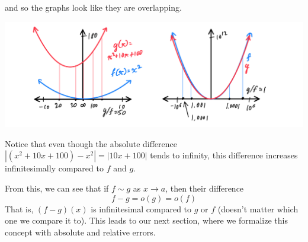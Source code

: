 \documentclass{article}
\theoremstyle{remark}
\theoremstyle{definition}
\begin{document}
\begin{enumerate}
    and so the graphs look like they are overlapping. 
    \begin{center}
        \includegraphics[scale=0.3]{img/Behavior_of_Quadratics_of_Same_order_as_infinity.PNG}
    \end{center}
    Notice that even though the absolute difference $|(x^2 + 10x + 100) - x^2| = |10x + 100|$ tends to infinity, this difference increases infinitesimally compared to $f$ and $g$. 
\end{enumerate}

From this, we can see that if $f \sim g$ as $x \rightarrow a$, then their difference 
\[f - g = o(g) = o(f)\]
That is, $(f-g)(x)$ is infinitesimal compared to $g$ or $f$ (doesn't matter which one we compare it to). This leads to our next section, where we formalize this concept with absolute and relative errors. 
\end{document}
